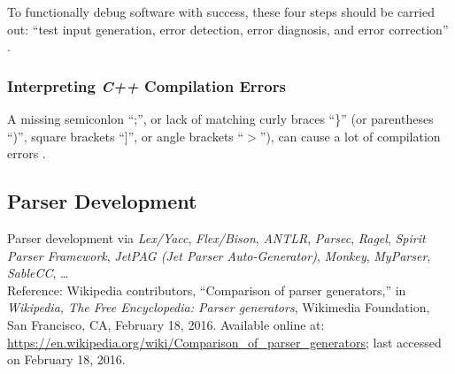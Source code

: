 	To  functionally debug software with success, these four steps should be carried out: ``test input generation, error detection, error diagnosis, and error correction'' \cite{Kirovski1997}. 
	
	

\subsubsection{Interpreting {\it C++} Compilation Errors}
\label{sssec:InterpretingCppCompilationErrors}

	A missing semiconlon ``;'', or lack of matching curly braces ``\}'' (or parentheses ``)'', square brackets ``]'', or angle brackets ``$>$''), can cause a lot of compilation errors \cite{Husted2000}.






\subsection{Parser Development}
\label{ssec:ParserDevelopment}

Parser development via {\it Lex/Yacc}, {\it Flex/Bison}, {\it ANTLR}, {\it Parsec}, {\it Ragel}, {\it Spirit Parser Framework}, {\it JetPAG (Jet Parser Auto-Generator)}, {\it Monkey}, {\it MyParser}, {\it SableCC}, \dots \\

	Reference: Wikipedia contributors, ``Comparison of parser generators,'' in {\it Wikipedia, The Free Encyclopedia: Parser generators}, Wikimedia Foundation, San Francisco, CA, February 18, 2016. Available online at: \url{https://en.wikipedia.org/wiki/Comparison_of_parser_generators}; last accessed on February 18, 2016.







































